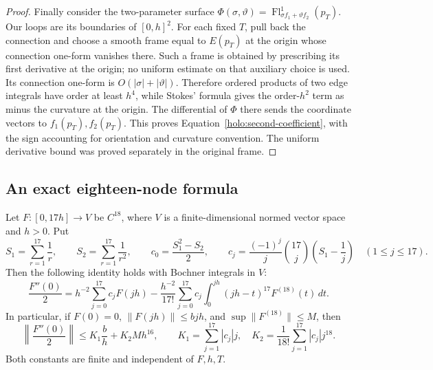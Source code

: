 \begin{proof}
Finally consider the two-parameter surface
$\Phi(\sigma,\vartheta)=
\operatorname{Fl}^1_{\sigma f_1+\vartheta f_2}(p_T)$.
Our loops are its boundaries of $[0,h]^2$.  For each fixed $T$,
pull back the connection and choose a smooth frame equal to
$E(p_T)$ at the origin whose connection one-form vanishes there.
Such a frame is obtained by prescribing its first derivative at
the origin; no uniform estimate on that auxiliary choice is used.
Its connection one-form is $O(|\sigma|+|\vartheta|)$.  Therefore
ordered products of two edge integrals have order at least $h^4$,
while Stokes' formula gives the order-$h^2$ term as minus the
curvature at the origin.  The differential of $\Phi$ there sends
the coordinate vectors to $f_1(p_T),f_2(p_T)$.  This proves
Equation~\eqref{holo:second-coefficient}, with the sign accounting
for orientation and curvature convention.  The uniform derivative
bound was proved separately in the original frame.
\end{proof}

\subsection{An exact eighteen-node formula}

\begin{lemma}
\label{holo:interpolation}
Let $F:[0,17h]\to V$ be $C^{18}$, where $V$ is a
finite-dimensional normed vector space and $h>0$.  Put
\[
 S_1=\sum_{r=1}^{17}\frac1r,\qquad
 S_2=\sum_{r=1}^{17}\frac1{r^2},\qquad
 c_0=\frac{S_1^2-S_2}{2},\qquad
 c_j=\frac{(-1)^j}{j}\binom{17}{j}
                   \left(S_1-\frac1j\right)\quad(1\leq j\leq17).
\]
Then the following identity holds with Bochner integrals in $V$:
\begin{equation}\label{holo:exact-interpolation}
 \frac{F''(0)}2
  =h^{-2}\sum_{j=0}^{17}c_jF(jh)
    -\frac{h^{-2}}{17!}\sum_{j=0}^{17}c_j
       \int_0^{jh}(jh-t)^{17}F^{(18)}(t)\,dt.
\end{equation}
In particular, if $F(0)=0$, $\|F(jh)\|\leq b jh$, and
$\sup\|F^{(18)}\|\leq M$, then
\begin{equation}\label{holo:interpolation-bound}
 \left\|\frac{F''(0)}2\right\|
       \leq K_1\frac b h+K_2 M h^{16},\qquad
 K_1=\sum_{j=1}^{17}|c_j|j,\quad
 K_2=\frac1{18!}\sum_{j=1}^{17}|c_j|j^{18}.
\end{equation}
Both constants are finite and independent of $F,h,T$.
\end{lemma}

